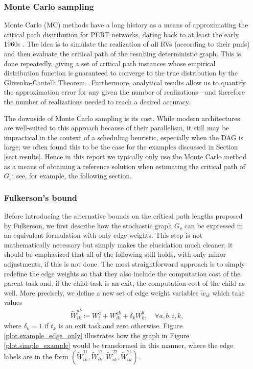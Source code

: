 \documentclass[12pt]{article}
\begin{document}
\subsubsection{Monte Carlo sampling}
\label{subsubsect.monte_carlo}

Monte Carlo (MC) methods have a long history as a means of approximating the critical path distribution for PERT networks, dating back to at least the early 1960s \cite{van1963letter}. The idea is to simulate the realization of all RVs (according to their pmfs) and then evaluate the critical path of the resulting deterministic graph. This is done repeatedly, giving a set of critical path instances whose empirical distribution function is guaranteed to converge to the true distribution by the Glivenko-Cantelli Theorem \cite{canon2016correlation}. Furthermore, analytical results allow us to quantify the approximation error for any given the number of realizations---and therefore the number of realizations needed to reach a desired accuracy.  

The downside of Monte Carlo sampling is its cost. While modern architectures are well-suited to this approach because of their parallelism, it still may be impractical in the context of a scheduling heuristic, especially when the DAG is large; we often found this to be the case for the examples discussed in Section \ref{sect.results}. Hence in this report we typically only use the Monte Carlo method as a means of obtaining a reference solution when estimating the critical path of $G_s$; see, for example, the following section. 

\subsubsection{Fulkerson's bound}
\label{subsubsect.fulkerson}

Before introducing the alternative bounds on the critical path lengths proposed by Fulkerson, we first describe how the stochastic graph $G_s$ can be expressed in an equivalent formulation with only edge weights. This step is not mathematically necessary but simply makes the elucidation much cleaner; it should be emphasized that all of the following still holds, with only minor adjustments, if this is not done. The most straightforward approach is to simply redefine the edge weights so that they also include the computation cost of the parent task and, if the child task is an exit, the computation cost of the child as well. More precisely, we define a new set of edge weight variables $\tilde{w}_{ik}$ which take values 
\begin{align*}
\tilde{W}_{ik}^{ab} \coloneqq W_i^a + W_{ik}^{ab} + \delta_k W_k^b,  \quad \forall a, b, i, k, 
\end{align*}
where $\delta_k = 1$ if $t_k$ is an exit task and zero otherwise. Figure \ref{plot.example_edge_only} illustrates how the graph in Figure \ref{plot.simple_example} would be transformed in this manner, where the edge labels are in the form $(\tilde{W}_{ik}^{11}, \tilde{W}_{ik}^{12}, \tilde{W}_{ik}^{22}, \tilde{W}_{ik}^{21})$.
\end{document}
